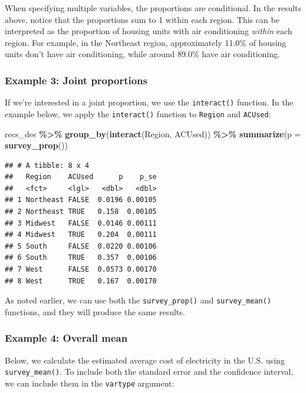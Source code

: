 \documentclass[
]{krantz}
\makeatletter
\newenvironment{Shaded}{\begin{snugshade}}{\end{snugshade}}
\newcommand{\AttributeTok}[1]{\textcolor[rgb]{0.27,0.27,0.27}{#1}}
\newcommand{\FunctionTok}[1]{\textcolor[rgb]{0.27,0.27,0.27}{\textbf{#1}}}
\newcommand{\NormalTok}[1]{#1}
\newcommand{\SpecialCharTok}[1]{\textcolor[rgb]{0.43,0.43,0.43}{\textbf{#1}}}
\newenvironment{kframe}{%
\medskip{}
\setlength{\fboxsep}{.8em}
 \def\at@end@of@kframe{}%
 \ifinner\ifhmode%
  \def\at@end@of@kframe{\end{minipage}}%
  \begin{minipage}{\columnwidth}%
 \fi\fi%
 \def\FrameCommand##1{\hskip\@totalleftmargin \hskip-\fboxsep
 \colorbox{shadecolor}{##1}\hskip-\fboxsep
     \hskip-\linewidth \hskip-\@totalleftmargin \hskip\columnwidth}%
 \MakeFramed {\advance\hsize-\width
   \@totalleftmargin\z@ \linewidth\hsize
   \@setminipage}}%
 {\par\unskip\endMakeFramed%
 \at@end@of@kframe}
\renewenvironment{Shaded}{\begin{kframe}}{\end{kframe}}
\makeatother
\begin{document}
When specifying multiple variables, the proportions are conditional. In the results above, notice that the proportions sum to 1 within each region. This can be interpreted as the proportion of housing units with air conditioning \emph{within} each region. For example, in the Northeast region, approximately 11.0\% of housing units don't have air conditioning, while around 89.0\% have air conditioning.

\hypertarget{example-3-joint-proportions}{%
\subsubsection*{Example 3: Joint proportions}\label{example-3-joint-proportions}}


If we're interested in a joint proportion, we use the \texttt{interact()} function. In the example below, we apply the \texttt{interact()} function to \texttt{Region} and \texttt{ACUsed}:

\begin{Shaded}
\begin{Highlighting}[]
\NormalTok{recs\_des }\SpecialCharTok{\%\textgreater{}\%}
  \FunctionTok{group\_by}\NormalTok{(}\FunctionTok{interact}\NormalTok{(Region, ACUsed)) }\SpecialCharTok{\%\textgreater{}\%}
  \FunctionTok{summarize}\NormalTok{(}\AttributeTok{p =} \FunctionTok{survey\_prop}\NormalTok{())}
\end{Highlighting}
\end{Shaded}

\begin{verbatim}
## # A tibble: 8 x 4
##   Region    ACUsed      p    p_se
##   <fct>     <lgl>   <dbl>   <dbl>
## 1 Northeast FALSE  0.0196 0.00105
## 2 Northeast TRUE   0.158  0.00105
## 3 Midwest   FALSE  0.0146 0.00111
## 4 Midwest   TRUE   0.204  0.00111
## 5 South     FALSE  0.0220 0.00106
## 6 South     TRUE   0.357  0.00106
## 7 West      FALSE  0.0573 0.00170
## 8 West      TRUE   0.167  0.00170
\end{verbatim}

As noted earlier, we can use both the \texttt{survey\_prop()} and \texttt{survey\_mean()} functions, and they will produce the same results.

\hypertarget{example-4-overall-mean}{%
\subsubsection*{Example 4: Overall mean}\label{example-4-overall-mean}}


Below, we calculate the estimated average cost of electricity in the U.S. using \texttt{survey\_mean()}. To include both the standard error and the confidence interval, we can include them in the \texttt{vartype} argument:
\end{document}
